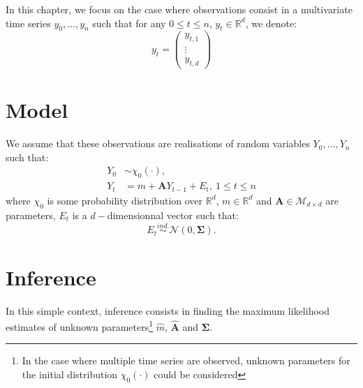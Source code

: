 \documentclass[
]{book}
\begin{document}
In this chapter, we focus on the case where observations consist in a multivariate time series \(y_0, \dots, y_n\) such that for any \(0\leq t \leq n\), \(y_t \in \mathbb{R}^d\), we denote:
\[y_t = 
\begin{pmatrix}
y_{t,1}\\
\vdots\\
y_{t, d}
\end{pmatrix}\]

\hypertarget{model}{%
\section{Model}\label{model}}

We assume that these observations are realisations of random variables \(Y_0,\dots, Y_n\) such that:
\begin{align}
Y_0 &\sim \chi_0(\cdot),\nonumber \\
Y_t &= m + \mathbf{A}Y_{t -1} + E_t,~1\leq t \leq n \label{eq:AR-simple}
\end{align}
where \(\chi_0\) is some probability distribution over \(\mathbb{R}^d\), \(m\in\mathbb{R}^d\) and \(\mathbf{A}\in \mathcal{M}_{d\times d}\) are parameters, \(E_t\) is a \(d-\)dimensionnal vector such that:
\begin{equation*}
E_t \overset{ind.}{\sim} \mathcal{N}\left(0, \mathbf{\Sigma}\right).
\end{equation*}

\hypertarget{inference}{%
\section{Inference}\label{inference}}

In this simple context, inference consists in finding the maximum likelihood estimates of unknown parameters\footnote{In the case where multiple time series are observed, unknown parameters for the initial distribution $\chi_0(\cdot)$ could be considered} \(\hat{m}\), \(\hat{\mathbf{A}}\) and \(\mathbf{\Sigma}\).
\end{document}
